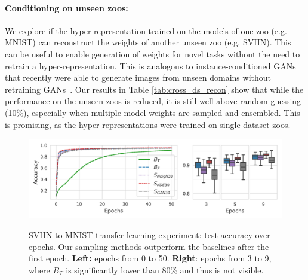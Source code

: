 \documentclass{article}
\begin{document}
\paragraph{Conditioning on unseen zoos:}
We explore if the hyper-representation trained on the models of one zoo (e.g. MNIST) can reconstruct the weights of another unseen zoo (e.g. SVHN).
This can be useful to enable generation of weights for novel tasks without the need to retrain a hyper-representation. This is analogous to instance-conditioned GANs that recently were able to generate images from unseen domains without retraining GANs~\citep{casanova2021instance}.
Our results in Table \ref{tab:cross_ds_recon} show that while the performance on the unseen zoos is reduced, it is still well above random guessing (10\%), especially when multiple model weights are sampled and ensembled. This is promising, as the hyper-representations were trained on single-dataset zoos. 

\begin{figure}%
\begin{minipage}{0.98\textwidth}
\begin{center}
\includegraphics[trim=0in 0in 0in 0in, clip, width=0.9\linewidth]{figures/accuracy_ood_line_box_svhn.png}
\vspace{-4mm}
\caption{SVHN to MNIST transfer learning experiment: test accuracy over epochs. Our sampling methods outperform the baselines after the first epoch. \textbf{Left:} epochs from 0 to 50. \textbf{Right}: epochs from 3 to 9, where $B_T$ is significantly lower than 80\% and thus is not visible.}
\vspace{-4mm}

\label{fig:sampling_accuracy_ood}    
\end{center}
\end{minipage}
\end{figure}



\end{document}
